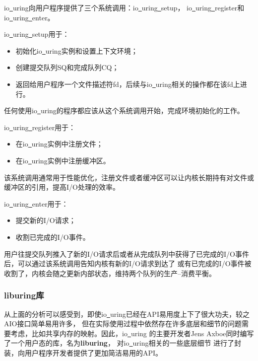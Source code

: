 \documentclass[supercite]{HustGraduPaper}
\theoremstyle{definition}
\begin{document}
io\underline{~}uring向用户程序提供了三个系统调用：io\underline{~}uring\underline{~}setup，
io\underline{~}uring\underline{~}register和io\underline{~}uring\underline{~}enter。\par

io\underline{~}uring\underline{~}setup用于：

\begin{itemize}
  \item 初始化io\underline{~}uring实例和设置上下文环境；
  \item 创建提交队列SQ和完成队列CQ；
  \item 返回给用户程序一个文件描述符fd，后续与io\underline{~}uring相关的操作都在该fd上进行。
\end{itemize}

任何使用io\underline{~}uring的程序都应该从这个系统调用开始，完成环境初始化的工作。\par

io\underline{~}uring\underline{~}register用于：
\begin{itemize}
  \item 在io\underline{~}uring实例中注册文件；
  \item 在io\underline{~}uring实例中注册缓冲区。
\end{itemize}

该系统调用通常用于性能优化，注册文件或者缓冲区可以让内核长期持有对文件或缓冲区的引用，提高I/O处理的效率。\par

io\underline{~}uring\underline{~}enter用于：
\begin{itemize}
  \item 提交新的I/O请求；
  \item 收割已完成的I/O事件。
\end{itemize}

用户往提交队列推入了新的I/O请求后或者从完成队列中获得了已完成的I/O事件后，可以通过该系统调用告知内核有新的I/O请求到达了
或有已完成的I/O事件被收割了，内核会随之更新内部状态，维持两个队列的生产--消费平衡。\par

\subsubsection{liburing库}
从上面的分析可以感受到，即使io\underline{~}uring已经在API易用度上下了很大功夫，较之AIO接口简单易用许多，
但在实际使用过程中依然存在许多底层和细节的问题需要考虑，比如共享内存的映射。因此，io\underline{~}uring
的主要开发者Jens Axboe同时编写了一个用户态的库，名为\textbf{liburing}\cite{repo2}，
对io\underline{~}uring相关的一些底层细节
进行了封装，向用户程序开发者提供了更加简洁易用的API。\par
\end{document}

